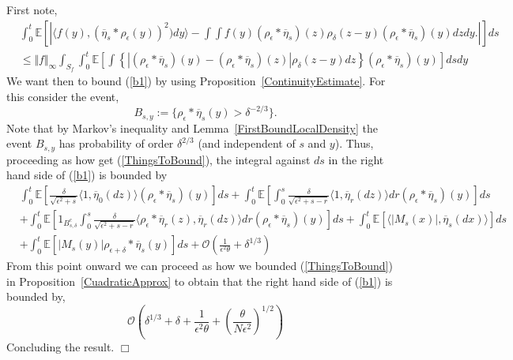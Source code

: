 \documentclass[12pt]{article}
\newenvironment {proof}{{\noindent\bf Proof }}{\hfill $\Box$ \medskip}
\newcommand{\IE}{\mathbb E}
\begin{document}
\begin{proof}
First note,
\begin{align}
&\int_0^t \mathbb{E}\left[| \langle f(y), (\overline{\eta}_s * \rho_\epsilon(y))^2) dy \rangle - \int \int f(y) (\rho_\epsilon * \overline{\eta}_s)(z) \rho_\delta (z-y) (\rho_\epsilon * \overline{\eta}_s)(y) dz dy. |\right] ds \nonumber \\ &\leq  \Vert f \Vert_\infty \int_{S_f}  \int_0^t  \mathbb{E}\left[ \int \left\{ \left|(\rho_\epsilon * \overline{\eta}_s)(y)-(\rho_\epsilon * \overline{\eta}_s)(z) \right|   \rho_\delta(z-y) dz \right\} (\rho_\epsilon *\overline{\eta}_s)(y) \right] ds  dy \label{b1}
\end{align}
We want then to bound (\ref{b1}) by using Proposition~\ref{ContinuityEstimate}. For this consider the event,
\[ B_{s,y} := \{ \rho_\epsilon * \overline{\eta}_s(y) > \delta^{-2/3} \}. \]
Note that by Markov's inequality and Lemma~\ref{FirstBoundLocalDensity} the event $B_{s,y}$ has probability of order $\delta^{2/3}$ (and independent of $s$ and $y$). Thus, proceeding as how get (\ref{ThingsToBound}), the integral against $ds$ in the right hand side of (\ref{b1}) is bounded by
\begin{align}
&\int_0^t \IE[ \frac{\delta}{\sqrt{\epsilon^2 + s}} \langle 1,\overline{\eta}_0(dz) \rangle (\rho_\epsilon *\overline{\eta}_s)(y) ] ds +  \int_0^t \IE[  \int_0^s \frac{\delta}{\sqrt{\epsilon^2 + s - r}} \langle 1, \overline{\eta}_r (dz) \rangle dr(\rho_\epsilon *\overline{\eta}_s)(y)  ] ds \nonumber\\ & + \int_0^t \IE[   1_{B^c_{s,\delta}} \int_0^s \frac{\delta}{\sqrt{\epsilon^2 + s - r}} \langle \rho_\epsilon*\overline{\eta}_r(z), \overline{\eta}_r(dz) \rangle dr (\rho_\epsilon *\overline{\eta}_s)(y) ] ds + \int_0^t \IE[\langle |M_s(x)|,\overline{\eta}_s(dx) \rangle] ds \nonumber \\ & + \int_0^t  \IE[|M_s(y)|\rho_{\epsilon+\delta}*\overline{\eta}_s(y)] ds  +\mathcal{O}\left( \frac{1}{\epsilon^2 \theta} + \delta^{1/3} \right)  \label{ThingsToBound2}
\end{align}
From this point onward we can proceed as how we bounded (\ref{ThingsToBound}) in Proposition~\ref{CuadraticApprox} to obtain that the right hand side of (\ref{b1}) is bounded by,
\[  \mathcal{O}\left(\delta^{1/3} + \delta+ \frac{1}{\epsilon^2 \theta} + \left( \frac{\theta}{N \epsilon^2}\right)^{1/2} \right)  \]
Concluding the result.
\end{proof}
\end{document}
